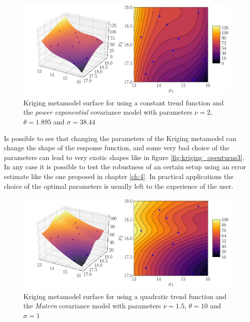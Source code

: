\begin{figure}[h]
\centering
\includegraphics[width=0.9\linewidth]{appendix_a/kriging_openturns}
\caption{Kriging metamodel surface for using a constant trend function and the \textit{power exponential} covariance model with parameters $\nu=2$, $\theta=1.895$ and $\sigma=38.44$}
\label{fig:kriging_openturns}
\end{figure}

Is possible to see that changing the parameters of the Kriging metamodel can change the shape of the response function, and some very bad choice of the parameters can lead to very exotic shapes like in figure \ref{fig:kriging_openturns3}. In any case it is possible to test the robustness of an certain setup using an error estimate like the one proposed in chapter \ref{ch:4}. In practical applications the choice of the optimal parameters is usually left to the experience of the user.

\begin{figure}[h]
	\centering
	\includegraphics[width=0.9\linewidth]{appendix_a/kriging_openturns2}
	\caption{Kriging metamodel surface for using a quadratic trend function and the \textit{Matern} covariance model with parameters $\nu=1.5$, $\theta=10$ and $\sigma=1$}
	\label{fig:kriging_openturns2}
\end{figure}

